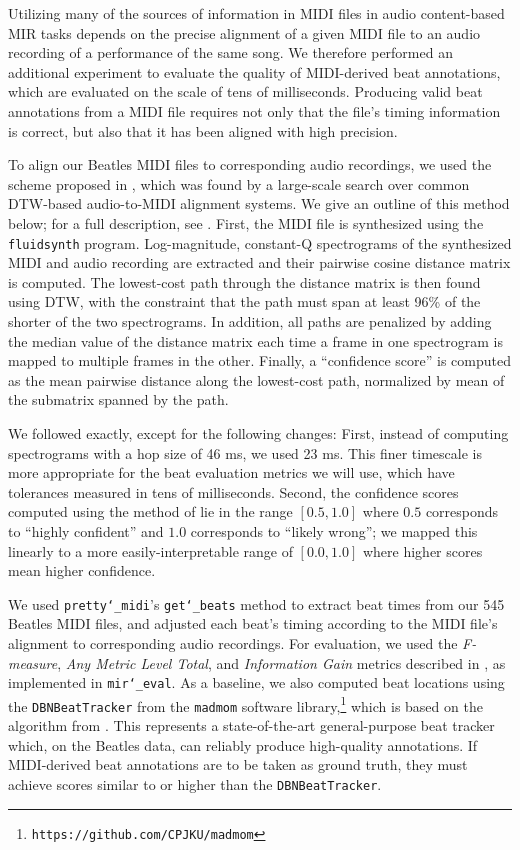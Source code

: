 \documentclass{article}
\begin{document}
Utilizing many of the sources of information in MIDI files in audio content-based MIR tasks depends on the precise alignment of a given MIDI file to an audio recording of a performance of the same song.
We therefore performed an additional experiment to evaluate the quality of MIDI-derived beat annotations, which are evaluated on the scale of tens of milliseconds.
Producing valid beat annotations from a MIDI file requires not only that the file's timing information is correct, but also that it has been aligned with high precision.

To align our Beatles MIDI files to corresponding audio recordings, we used the scheme proposed in \cite{raffel2016optimizing}, which was found by a large-scale search over common DTW-based audio-to-MIDI alignment systems.
We give an outline of this method below; for a full description, see \cite{raffel2016optimizing}.
First, the MIDI file is synthesized using the \texttt{fluidsynth} program.
Log-magnitude, constant-Q spectrograms of the synthesized MIDI and audio recording are extracted and their pairwise cosine distance matrix is computed.
The lowest-cost path through the distance matrix is then found using DTW, with the constraint that the path must span at least 96\% of the shorter of the two spectrograms.
In addition, all paths are penalized by adding the median value of the distance matrix each time a frame in one spectrogram is mapped to multiple frames in the other.
Finally, a ``confidence score'' is computed as the mean pairwise distance along the lowest-cost path, normalized by mean of the submatrix spanned by the path.

We followed \cite{raffel2016optimizing} exactly, except for the following changes:
First, instead of computing spectrograms with a hop size of 46 ms, we used 23 ms.
This finer timescale is more appropriate for the beat evaluation metrics we will use, which have tolerances measured in tens of milliseconds.
Second, the confidence scores computed using the method of \cite{raffel2016optimizing} lie in the range $[0.5, 1.0]$ where $0.5$ corresponds to ``highly confident'' and $1.0$ corresponds to ``likely wrong''; we mapped this linearly to a more easily-interpretable range of $[0.0, 1.0]$ where higher scores mean higher confidence.

We used \texttt{pretty\char`_midi}'s \texttt{get\char`_beats} method to extract beat times from our 545 Beatles MIDI files, and adjusted each beat's timing according to the MIDI file's alignment to corresponding audio recordings.
For evaluation, we used the {\em F-measure}, {\em Any Metric Level Total}, and {\em Information Gain} metrics described in \cite{davies2009evaluation}, as implemented in \texttt{mir\char`_eval}.
As a baseline, we also computed beat locations using the \texttt{DBNBeatTracker} from the \texttt{madmom} software library,\footnote{\texttt{https://github.com/CPJKU/madmom}} which is based on the algorithm from \cite{bock2014multi}.
This represents a state-of-the-art general-purpose beat tracker which, on the Beatles data, can reliably produce high-quality annotations.
If MIDI-derived beat annotations are to be taken as ground truth, they must achieve scores similar to or higher than the \texttt{DBNBeatTracker}.
\end{document}
